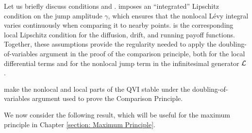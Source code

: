 Let us briefly discuss conditions  and .  imposes an ``integrated'' Lipschitz condition on the jump amplitude $\gamma$, which ensures that the nonlocal Lévy integral varies continuously when comparing it to nearby points.  is the corresponding local Lipschitz condition for the diffusion, drift, and running payoff functions. Together, these assumptions provide the regularity needed to apply the doubling-of-variables argument in the proof of the comparison principle, both for the local differential terms and for the nonlocal jump term in the infinitesimal generator $\mathcal{L}$.

make the nonlocal and local parts of the QVI stable under the doubling-of-variables argument used to prove the Comparison Principle.

We now consider the following result, which will be useful for the maximum principle in Chapter \ref{section: Maximum Principle}. 

